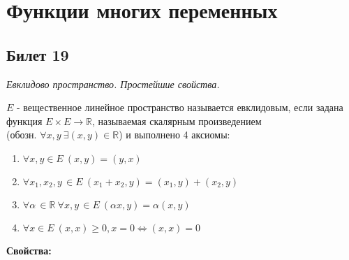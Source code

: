 \section{Функции многих переменных}
\subsection{Билет 19}


\textit{Евклидово пространство. Простейшие свойства.}


 $E$ - вещественное линейное пространство называется евклидовым, если задана функция $E \times E \to \mathbb{R}$, называемая скалярным произведением \\ 
(обозн. $\forall x, y\ \exists (x, y) \in \mathbb{R}$) и выполнено 4 аксиомы:
  \begin{enumerate}
    \item $\forall x, y \in E\ (x, y) = (y, x)$
    \item $\forall x_1, x_2, y\,\in E\ (x_1 + x_2, y) = (x_1, y) + (x_2, y) $
    \item $\forall \alpha\,\in \mathbb{R}\ \forall x, y\,\in E\ (\alpha x, y) = \alpha(x, y)$
    \item $\forall x \in E\ (x, x) \ge 0, x = 0 \Leftrightarrow (x, x) = 0$
  \end{enumerate}
  
  \begin{center}
   \textbf{Свойства:}
  \end{center}



